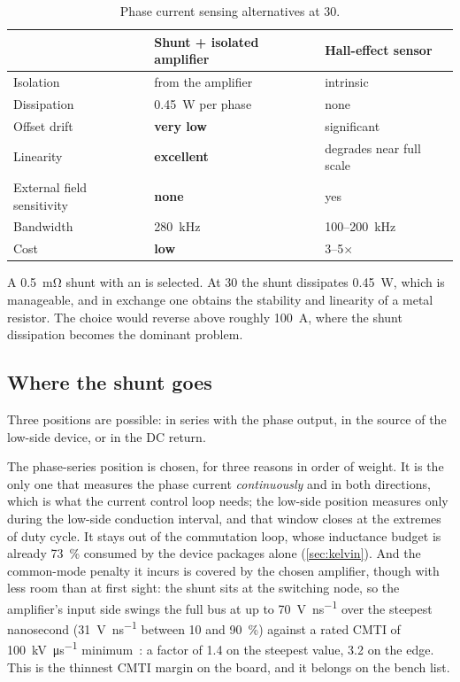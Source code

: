 \begin{table}[htbp]
\centering
\caption{Phase current sensing alternatives at \SI{30}{\Arms}.}
\label{tab:sensing}
\small
\begin{tabularx}{\textwidth}{lYY}
\toprule
 & \textbf{Shunt + isolated amplifier} & Hall-effect sensor \\
\midrule
Isolation & from the amplifier & intrinsic \\
Dissipation & \SI{0.45}{\watt} per phase & none \\
Offset drift & \textbf{very low} & significant \\
Linearity & \textbf{excellent} & degrades near full scale \\
External field sensitivity & \textbf{none} & yes \\
Bandwidth & \SI{280}{\kilo\hertz} & \SI{100}{}--\SI{200}{\kilo\hertz} \\
Cost & \textbf{low} & 3--5$\times$ \\
\bottomrule
\end{tabularx}
\end{table}

A \SI{0.5}{\milli\ohm} shunt with an \isoamp{} is selected. At
\SI{30}{\Arms} the shunt dissipates \SI{0.45}{\watt}, which is manageable,
and in exchange one obtains the stability and linearity of a metal
resistor. The choice would reverse above roughly \SI{100}{\ampere}, where
the shunt dissipation becomes the dominant problem.

\subsection{Where the shunt goes}

Three positions are possible: in series with the phase output, in the source
of the low-side device, or in the DC return.

The phase-series position is chosen, for three reasons in order of weight.
It is the only one that measures the phase current \emph{continuously} and in
both directions, which is what the current control loop needs; the low-side
position measures only during the low-side conduction interval, and that
window closes at the extremes of duty cycle. It stays out of the commutation
loop, whose inductance budget is already \SI{73}{\percent} consumed by the
device packages alone (\cref{sec:kelvin}). And the common-mode penalty it
incurs is covered by the chosen amplifier, though with less room than at
first sight: the shunt sits at the switching node, so the amplifier's input
side swings the full bus at up to \SI{70}{\volt\per\nano\second} over the
steepest nanosecond (\SI{31}{\volt\per\nano\second} between \SI{10}{} and
\SI{90}{\percent}) against a rated CMTI of
\SI{100}{\kilo\volt\per\micro\second} minimum~\cite{ti_amc1302}: a factor of
1.4 on the steepest value, 3.2 on the edge. This is the thinnest CMTI margin
on the board, and it belongs on the bench list.

